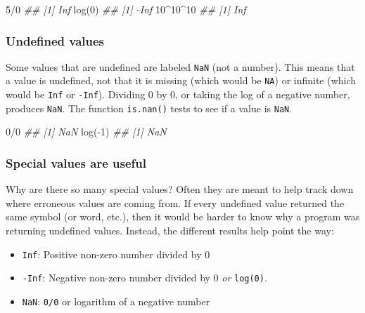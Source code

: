 \documentclass[
  13,
  letterpaper,
]{report}
\newenvironment{Shaded}{\begin{snugshade}}{\end{snugshade}}
\newcommand{\DecValTok}[1]{\textcolor[rgb]{0.68,0.00,0.00}{#1}}
\newcommand{\DocumentationTok}[1]{\textcolor[rgb]{0.37,0.37,0.37}{\textit{#1}}}
\newcommand{\FunctionTok}[1]{\textcolor[rgb]{0.28,0.35,0.67}{#1}}
\newcommand{\NormalTok}[1]{\textcolor[rgb]{0.00,0.23,0.31}{#1}}
\newcommand{\SpecialCharTok}[1]{\textcolor[rgb]{0.37,0.37,0.37}{#1}}
\providecommand{\tightlist}{%
  \setlength{\itemsep}{0pt}\setlength{\parskip}{0pt}}
\begin{document}
\begin{Shaded}
\begin{Highlighting}[]
\DecValTok{5}\SpecialCharTok{/}\DecValTok{0}
\DocumentationTok{\#\# [1] Inf}
\FunctionTok{log}\NormalTok{(}\DecValTok{0}\NormalTok{)}
\DocumentationTok{\#\# [1] {-}Inf}
\DecValTok{10}\SpecialCharTok{\^{}}\DecValTok{10}\SpecialCharTok{\^{}}\DecValTok{10}
\DocumentationTok{\#\# [1] Inf}
\end{Highlighting}
\end{Shaded}

\subsubsection{Undefined values}\label{sec-object-type-spec-nan}

Some values that are undefined are labeled \texttt{NaN} (not a number).
This means that a value is undefined, not that it is missing (which
would be \texttt{NA}) or infinite (which would be \texttt{Inf} or
\texttt{-Inf}). Dividing 0 by 0, or taking the log of a negative number,
produces \texttt{NaN}. The function \texttt{is.nan()} tests to see if a
value is \texttt{NaN}.

\begin{Shaded}
\begin{Highlighting}[]
\DecValTok{0}\SpecialCharTok{/}\DecValTok{0}
\DocumentationTok{\#\# [1] NaN}
\FunctionTok{log}\NormalTok{(}\SpecialCharTok{{-}}\DecValTok{1}\NormalTok{)}
\DocumentationTok{\#\# [1] NaN}
\end{Highlighting}
\end{Shaded}

\subsubsection{Special values are
useful}\label{sec-object-type-spec-why}

Why are there so many special values? Often they are meant to help track
down where erroneous values are coming from. If every undefined value
returned the same symbol (or word, etc.), then it would be harder to
know why a program was returning undefined values. Instead, the
different results help point the way:

\begin{itemize}
\tightlist
\item
  \texttt{Inf}: Positive non-zero number divided by 0
\item
  \texttt{-Inf}: Negative non-zero number divided by 0 \emph{or}
  \texttt{log(0)}.
\item
  \texttt{NaN}: \texttt{0/0} or logarithm of a negative number
\end{itemize}
\end{document}
